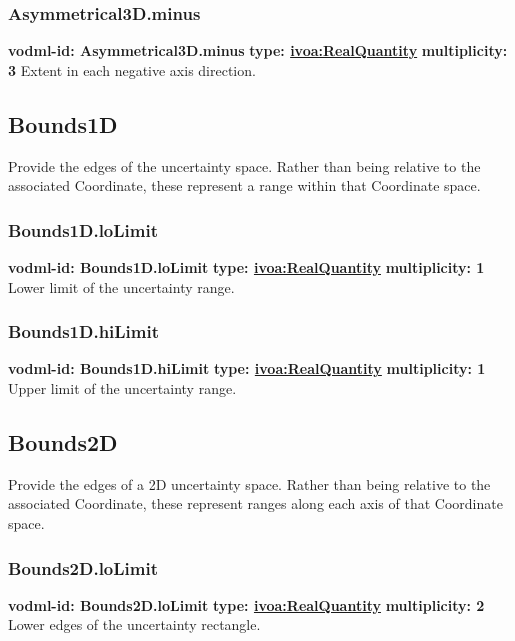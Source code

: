     \subsubsection{Asymmetrical3D.minus}
      \textbf{vodml-id: Asymmetrical3D.minus} \newline
      \textbf{type: \hyperref[sect:ivoa]{ivoa:RealQuantity}} \newline
      \textbf{multiplicity: 3} \newline 
      Extent in each negative axis direction.

  \subsection{Bounds1D}
  \label{sect:Bounds1D}
    Provide the edges of the uncertainty space. Rather than being relative to the associated Coordinate, these represent a range within that Coordinate space.

    \subsubsection{Bounds1D.loLimit}
      \textbf{vodml-id: Bounds1D.loLimit} \newline
      \textbf{type: \hyperref[sect:ivoa]{ivoa:RealQuantity}} \newline
      \textbf{multiplicity: 1} \newline 
      Lower limit of the uncertainty range.

    \subsubsection{Bounds1D.hiLimit}
      \textbf{vodml-id: Bounds1D.hiLimit} \newline
      \textbf{type: \hyperref[sect:ivoa]{ivoa:RealQuantity}} \newline
      \textbf{multiplicity: 1} \newline 
      Upper limit of the uncertainty range.

  \subsection{Bounds2D}
  \label{sect:Bounds2D}
    Provide the edges of a 2D uncertainty space. Rather than being relative to the associated Coordinate, these represent ranges along each axis of that Coordinate space.

    \subsubsection{Bounds2D.loLimit}
      \textbf{vodml-id: Bounds2D.loLimit} \newline
      \textbf{type: \hyperref[sect:ivoa]{ivoa:RealQuantity}} \newline
      \textbf{multiplicity: 2} \newline 
      Lower edges of the uncertainty rectangle.

